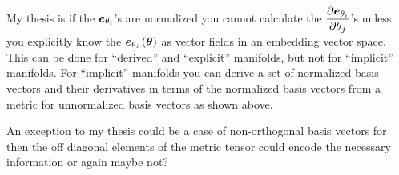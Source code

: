 \documentclass[12pt]{book}
\begin{document}
My thesis is if the $\bm{e}_{\theta_{i}}$'s are normalized you cannot calculate the 
$\displaystyle\frac{\partial{\bm{e}_{\theta_{i}}}}{\partial{\theta_{j}}}$'s unless you explicitly know the
 ${\bm{e}_{\theta_{i}}}\left ( {\bm{\theta}} \right )$ as vector fields in an embedding vector space.  This can be done for
``derived'' and ``explicit'' manifolds, but not for ``implicit'' manifolds. For ``implicit'' manifolds you can 
derive a set of normalized basis vectors and their derivatives in terms of the normalized basis vectors from
a metric for unnormalized basis vectors as shown above.
 
An exception to my thesis could be a case of non-orthogonal basis vectors for then the off diagonal elements of
the metric tensor could encode the necessary information or again maybe not?  
\end{document}
